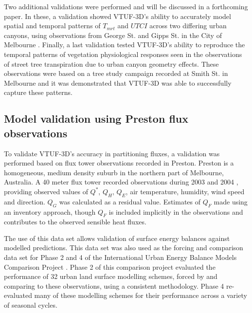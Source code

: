 \documentclass[preprint,12pt,authoryear]{elsarticle}
\begin{document}
Two additional validations were performed and will be discussed in a forthcoming paper. In these, a validation showed VTUF-3D's ability to accurately model spatial and temporal patterns of $T_{mrt}$ and $UTCI$ across two differing urban canyons, using observations from George St. and Gipps St. in the City of Melbourne \citep{Coutts2015,White2012}. Finally, a last validation tested VTUF-3D's ability to reproduce the temporal patterns of vegetation physiological responses seen in the observations of street tree transpiration due to urban canyon geometry effects. These observations were based on a  tree study campaign recorded at Smith St. in Melbourne \citep{Gebert2012,Coutts2014a} and it was demonstrated that VTUF-3D was able to successfully capture these patterns.












\subsection{Model validation using Preston flux observations}\label{sec:PrestonValidations}

To validate VTUF-3D's accuracy in partitioning fluxes, a validation was performed based on flux tower observations recorded in Preston. Preston is a homogeneous, medium density suburb in the northern part of Melbourne, Australia. A 40 meter flux tower recorded observations during 2003 and 2004 \citep{Coutts2007}, providing observed values of $Q^{*}$, $Q_{H}$, $Q_{E}$, air temperature, humidity, wind speed and direction. $Q_{G}$ was calculated as a residual value. Estimates of $Q_{F}$ made using an inventory approach, though $Q_{F}$ is included implicitly in the observations and contributes to the observed sensible heat fluxes. 

The use of this data set allows validation of surface energy balances against modelled predictions. This data set was also used as the forcing and comparison data set for Phase 2 and 4 of the International Urban Energy Balance Models Comparison Project \citep{Grimmond2011,Best2012}. Phase 2 of this comparison project evaluated the performance of 32 urban land surface modelling schemes, forced by and comparing to these observations, using a consistent methodology. Phase 4 re-evaluated many of these modelling schemes for their performance across a variety of seasonal cycles.
\end{document}
